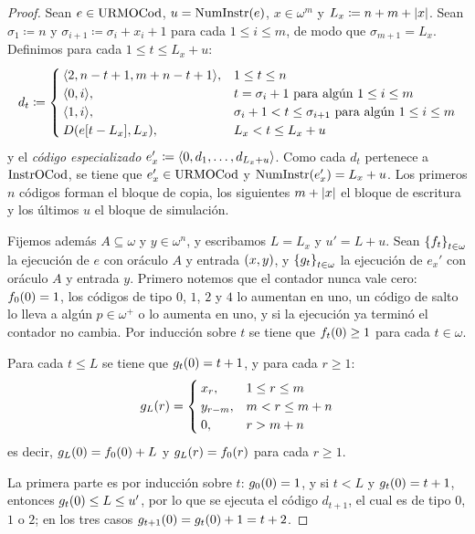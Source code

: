 \begin{agregado}
\begin{agregado}
\begin{correccion}
\begin{proof}
	Sean $e\in\URMOCODIGO$, $u =\NUMINSTRUCCIONES\pa*{e}$, $x\in\omega^{m}$ y $L_{x}\coloneqq n + m +\abs*{x}$. Sean $\sigma_{1}\coloneqq n$ y $\sigma_{i + 1}\coloneqq\sigma_{i} + x_{i} + 1$ para cada $1\leq i\leq m$, de modo que $\sigma_{m + 1} = L_{x}$. Definimos para cada $1\leq t\leq L_{x} + u$:
	\[
		d_{t}\coloneqq
		\begin{cases}
			\inner*{2, n - t + 1, m + n - t + 1}, & 1\leq t\leq n\\
			\inner*{0, i}, & t =\sigma_{i} + 1\text{ para algún } 1\leq i\leq m\\
			\inner*{1, i}, &\sigma_{i} + 1 < t\leq\sigma_{i + 1}\text{ para algún } 1\leq i\leq m\\
			D\pa*{e\bra*{t - L_{x}}, L_{x}}, & L_{x} < t\leq L_{x} + u
		\end{cases}
	\]
	y el \emph{código especializado} $e_{x}'\coloneqq\inner*{0, d_{1},\dotsc, d_{L_{x} + u}}$. Como cada $d_{t}$ pertenece a $\INSTRUCCIONESOCOD$, se tiene que $e_{x}'\in\URMOCODIGO$ y $\NUMINSTRUCCIONES\pa*{e_{x}'} = L_{x} + u$. Los primeros $n$ códigos forman el bloque de copia, los siguientes $m +\abs*{x}$ el bloque de escritura y los últimos $u$ el bloque de simulación.

	Fijemos además $A\subseteq\omega$ y $y\in\omega^{n}$, y escribamos $L = L_{x}$ y $u' = L + u$. Sean $\set*{f_{t}}_{t\in\omega}$ la ejecución de $e$ con oráculo $A$ y entrada $\pa*{x, y}$, y $\set*{g_{t}}_{t\in\omega}$ la ejecución de $e_{x}'$ con oráculo $A$ y entrada $y$. Primero notemos que el contador nunca vale cero: $f_{0}\pa*{0} = 1$, los códigos de tipo $0$, $1$, $2$ y $4$ lo aumentan en uno, un código de salto lo lleva a algún $p\in\omega^{+}$ o lo aumenta en uno, y si la ejecución ya terminó el contador no cambia. Por inducción sobre $t$ se tiene que $f_{t}\pa*{0}\geq 1$ para cada $t\in\omega$.

	Para cada $t\leq L$ se tiene que $g_{t}\pa*{0} = t + 1$, y para cada $r\geq 1$:
	\[
		g_{L}\pa*{r} =
		\begin{cases}
			x_{r}, & 1\leq r\leq m\\
			y_{r - m}, & m < r\leq m + n\\
			0, & r > m + n
		\end{cases}
	\]
	es decir, $g_{L}\pa*{0} = f_{0}\pa*{0} + L$ y $g_{L}\pa*{r} = f_{0}\pa*{r}$ para cada $r\geq 1$.

	La primera parte es por inducción sobre $t$: $g_{0}\pa*{0} = 1$, y si $t < L$ y $g_{t}\pa*{0} = t + 1$, entonces $g_{t}\pa*{0}\leq L\leq u'$, por lo que se ejecuta el código $d_{t + 1}$, el cual es de tipo $0$, $1$ o $2$; en los tres casos $g_{t + 1}\pa*{0} = g_{t}\pa*{0} + 1 = t + 2$.


\end{proof}
\end{correccion}
\end{agregado}
\end{agregado}

